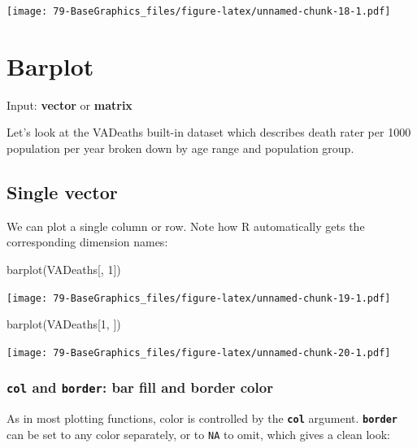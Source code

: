 \documentclass[
]{book}
\newenvironment{Shaded}{\begin{snugshade}}{\end{snugshade}}
\newcommand{\DecValTok}[1]{\textcolor[rgb]{0.00,0.00,0.81}{#1}}
\newcommand{\FunctionTok}[1]{\textcolor[rgb]{0.00,0.00,0.00}{#1}}
\newcommand{\NormalTok}[1]{#1}
\begin{document}
\texttt{[image: 79-BaseGraphics\_files/figure-latex/unnamed-chunk-18-1.pdf]}

\hypertarget{barplot}{%
\section{Barplot}\label{barplot}}

Input: \textbf{vector} or \textbf{matrix}

Let's look at the VADeaths built-in dataset which describes death rater per 1000 population per year broken down by age range and population group.

\hypertarget{single-vector}{%
\subsection{Single vector}\label{single-vector}}

We can plot a single column or row. Note how R automatically gets the corresponding dimension names:

\begin{Shaded}
\begin{Highlighting}[]
\FunctionTok{barplot}\NormalTok{(VADeaths[, }\DecValTok{1}\NormalTok{])}
\end{Highlighting}
\end{Shaded}

\texttt{[image: 79-BaseGraphics\_files/figure-latex/unnamed-chunk-19-1.pdf]}

\begin{Shaded}
\begin{Highlighting}[]
\FunctionTok{barplot}\NormalTok{(VADeaths[}\DecValTok{1}\NormalTok{, ])}
\end{Highlighting}
\end{Shaded}

\texttt{[image: 79-BaseGraphics\_files/figure-latex/unnamed-chunk-20-1.pdf]}

\hypertarget{col-and-border-bar-fill-and-border-color}{%
\subsubsection{\texorpdfstring{\textbf{\texttt{col}} and \textbf{\texttt{border}}: bar fill and border color}{col and border: bar fill and border color}}\label{col-and-border-bar-fill-and-border-color}}

As in most plotting functions, color is controlled by the \textbf{\texttt{col}} argument. \textbf{\texttt{border}} can be set to any color separately, or to \texttt{NA} to omit, which gives a clean look:
\end{document}
